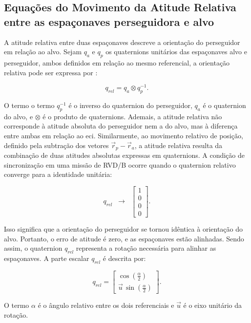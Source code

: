 \subsection{Equações do Movimento da Atitude Relativa entre as espaçonaves perseguidora e alvo} %

A atitude relativa entre duas espaçonaves descreve a orientação do perseguidor em relação ao alvo.
Sejam $q_a$ e $q_p$ os quaternions unitários das espaçonaves alvo e perseguidor, ambos definidos em relação ao mesmo referencial, a orientação relativa pode ser expressa por \cite{na2019vision}:

\begin{equation}
q_{rel}
=
q_a \otimes q_p^{-1}.
\label{eq_quat_relativo}
\end{equation}

O termo o termo $q_p^{-1}$ é o inverso do quaternion do perseguidor, $q_a$ é o quaternion do alvo, e $\otimes$ é o produto de quaternions.
Ademais, a atitude relativa não corresponde à atitude absoluta do perseguidor nem a do alvo, mas à diferença entre ambas em relação ao \gls{eci}. 
Similarmente, ao movimento relativo de posição, definido pela subtração dos vetores $\vec r_p - \vec r_a$, a atitude relativa resulta da combinação de duas atitudes absolutas expressas em quaternions. 
A condição de sincronização em uma missão de RVD/B ocorre quando o quaternion relativo converge para a identidade unitária:

\begin{equation}
\label{eq_qrel_sincronizacao}
q_{rel} \;\;\longrightarrow\;\; 
\begin{bmatrix}1 \\ 0 \\ 0 \\ 0\end{bmatrix}.
\end{equation}

Isso significa que a orientação do perseguidor se tornou idêntica à orientação do alvo. 
Portanto, o erro de atitude é zero, e as espaçonaves estão alinhadas.
Sendo assim, o quaternion $q_{rel}$ representa a rotação necessária para alinhar as espaçonaves.
A parte escalar $q_{rel}$ é descrita por:

\begin{equation}
q_{rel} =
\begin{bmatrix}
\cos\!\left(\tfrac{\alpha}{2}\right) \\[4pt]
\vec{u}\,\sin\!\left(\tfrac{\alpha}{2}\right)
\end{bmatrix}.
\end{equation}

O termo $\alpha$ é o ângulo relativo entre os dois referenciais e $\vec u$ é o eixo unitário da rotação.
